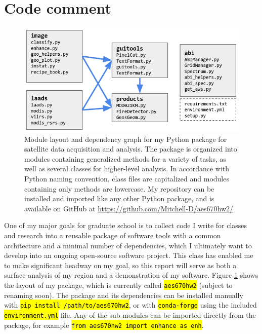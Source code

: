 \documentclass[12pt]{article}
\newcommand{\hltexttt}[1]{\texttt{\hl{#1}}}
\begin{document}
\clearpage

\section{Code comment}\label{code_comment}

\begin{figure}[h!]
    \centering
    \includegraphics[width=.7\paperwidth]{figs/repo.png}

    \caption{Module layout and dependency graph for my Python package for satellite data acquisition and analysis. The package is organized into modules containing generalized methods for a variety of tasks, as well as several classes for higher-level analysis. In accordance with Python naming convention, class files are capitalized and modules containing only methods are lowercase. My repository can be installed and imported like any other Python package, and is available on GitHub at \url{https://github.com/Mitchell-D/aes670hw2/}}
    \label{repo_diagram}
\end{figure}

One of my major goals for graduate school is to collect code I write for classes and research into a reusable package of software tools with a common architecture and a minimal number of dependencies, which I ultimately want to develop into an ongoing open-source software project. This class has enabled me to make significant headway on my goal, so this report will serve as both a surface analysis of my region and a demonstration of my software. Figure \ref{repo_diagram} shows the layout of my package, which is currently called \hltexttt{aes670hw2} (subject to renaming soon). The package and its dependencies can be installed manually with \hltexttt{pip install /path/to/aes670hw2}, or with \hltexttt{conda-forge} using the included \hltexttt{environment.yml} file. Any of the sub-modules can be imported directly from the package, for example \hltexttt{from aes670hw2 import enhance as enh}.
\end{document}
